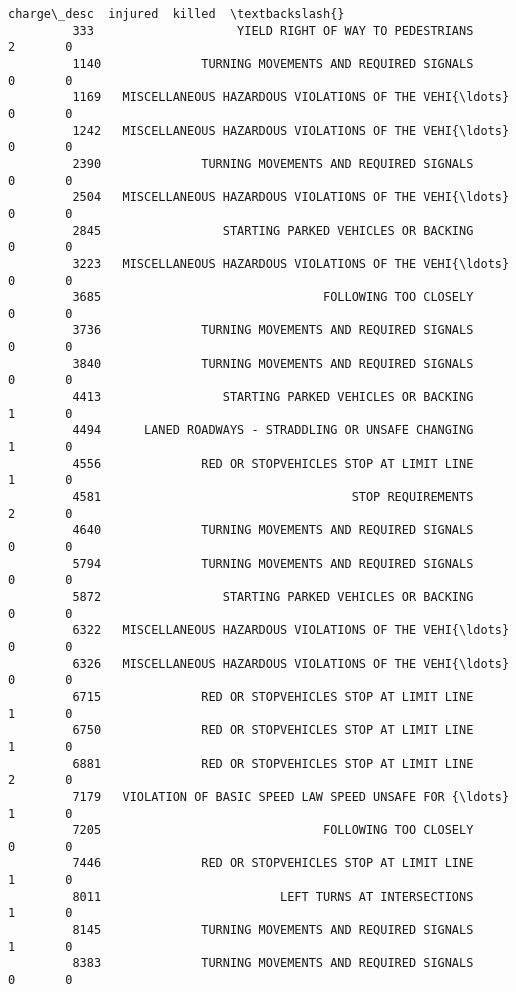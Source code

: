 \documentclass[11pt]{article}
\begin{document}
\begin{Verbatim}[commandchars=\\\{\}]
                                                      charge\_desc  injured  killed  \textbackslash{}
         333                    YIELD RIGHT OF WAY TO PEDESTRIANS        2       0   
         1140              TURNING MOVEMENTS AND REQUIRED SIGNALS        0       0   
         1169   MISCELLANEOUS HAZARDOUS VIOLATIONS OF THE VEHI{\ldots}        0       0   
         1242   MISCELLANEOUS HAZARDOUS VIOLATIONS OF THE VEHI{\ldots}        0       0   
         2390              TURNING MOVEMENTS AND REQUIRED SIGNALS        0       0   
         2504   MISCELLANEOUS HAZARDOUS VIOLATIONS OF THE VEHI{\ldots}        0       0   
         2845                 STARTING PARKED VEHICLES OR BACKING        0       0   
         3223   MISCELLANEOUS HAZARDOUS VIOLATIONS OF THE VEHI{\ldots}        0       0   
         3685                               FOLLOWING TOO CLOSELY        0       0   
         3736              TURNING MOVEMENTS AND REQUIRED SIGNALS        0       0   
         3840              TURNING MOVEMENTS AND REQUIRED SIGNALS        0       0   
         4413                 STARTING PARKED VEHICLES OR BACKING        1       0   
         4494      LANED ROADWAYS - STRADDLING OR UNSAFE CHANGING        1       0   
         4556              RED OR STOPVEHICLES STOP AT LIMIT LINE        1       0   
         4581                                   STOP REQUIREMENTS        2       0   
         4640              TURNING MOVEMENTS AND REQUIRED SIGNALS        0       0   
         5794              TURNING MOVEMENTS AND REQUIRED SIGNALS        0       0   
         5872                 STARTING PARKED VEHICLES OR BACKING        0       0   
         6322   MISCELLANEOUS HAZARDOUS VIOLATIONS OF THE VEHI{\ldots}        0       0   
         6326   MISCELLANEOUS HAZARDOUS VIOLATIONS OF THE VEHI{\ldots}        0       0   
         6715              RED OR STOPVEHICLES STOP AT LIMIT LINE        1       0   
         6750              RED OR STOPVEHICLES STOP AT LIMIT LINE        1       0   
         6881              RED OR STOPVEHICLES STOP AT LIMIT LINE        2       0   
         7179   VIOLATION OF BASIC SPEED LAW SPEED UNSAFE FOR {\ldots}        1       0   
         7205                               FOLLOWING TOO CLOSELY        0       0   
         7446              RED OR STOPVEHICLES STOP AT LIMIT LINE        1       0   
         8011                         LEFT TURNS AT INTERSECTIONS        1       0   
         8145              TURNING MOVEMENTS AND REQUIRED SIGNALS        1       0   
         8383              TURNING MOVEMENTS AND REQUIRED SIGNALS        0       0   

\end{Verbatim}
\end{document}
